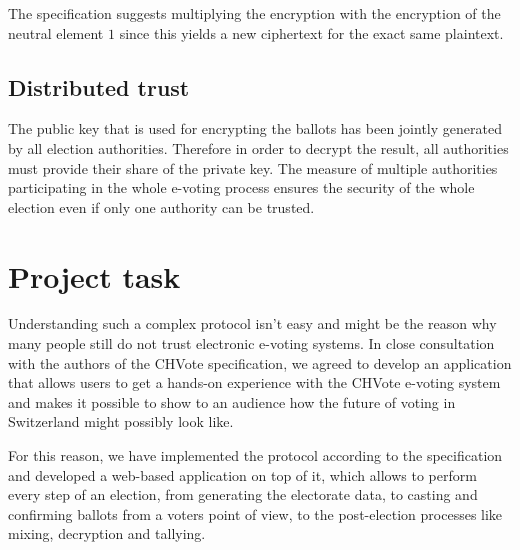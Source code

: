 The specification suggests multiplying the encryption with the encryption of the neutral element $1$ since this yields a new ciphertext for the exact same plaintext.

\subsection{Distributed trust}
The public key that is used for encrypting the ballots has been jointly generated by all election authorities. Therefore in order to decrypt the result, all authorities must provide their share of the private key. The measure of multiple authorities participating in the whole e-voting process ensures the security of the whole election even if only one authority can be trusted.

\section{Project task}

Understanding such a complex protocol isn't easy and might be the reason why many people still do not trust electronic e-voting systems. In close consultation with the authors of the CHVote specification, we agreed to develop an application that allows users to get a hands-on experience with the CHVote e-voting system and makes it possible to show to an audience how the future of voting in Switzerland might possibly look like.

For this reason, we have implemented the protocol according to the specification and developed a web-based application on top of it, which allows to perform every step of an election, from generating the electorate data, to casting and confirming ballots from a voters point of view, to the post-election processes like mixing, decryption and tallying.
